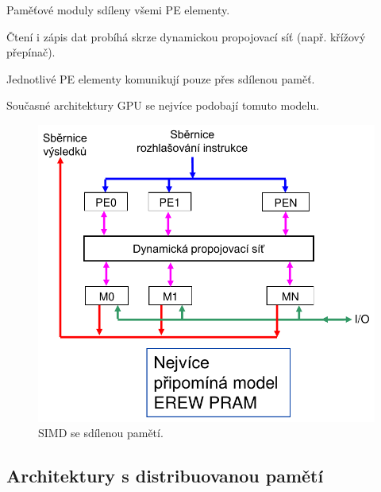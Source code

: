 \begin{compactitem}
    \item Paměťové moduly sdíleny všemi PE elementy.
    \item Čtení i zápis dat probíhá skrze dynamickou propojovací síť (např. křížový přepínač).
    \item Jednotlivé PE elementy komunikují pouze přes sdílenou paměť.
    \item Současné architektury GPU se nejvíce podobají tomuto modelu.

    \begin{figure}[H]
        \centering
        \includegraphics[width=0.75\linewidth]{simd_sdilena.pdf}
        \caption{SIMD se sdílenou pamětí.}
    \end{figure}
\end{compactitem}

\subsection{Architektury s distribuovanou pamětí}

